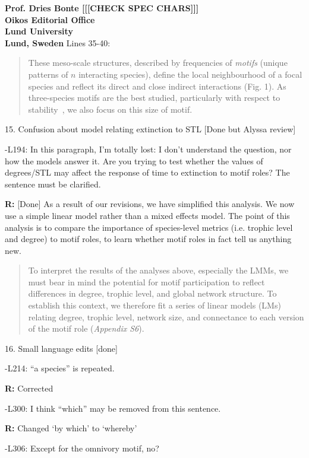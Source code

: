 \documentclass[12pt]{letter}
\begin{document}
\begin{letter}{\bf Prof. Dries Bonte [[[CHECK SPEC CHARS]]]\\
Oikos Editorial Office \\
Lund University \\
Lund, Sweden}
        Lines 35-40:
        
        \begin{quotation}
    	These meso-scale structures, described by frequencies of \emph{motifs} (unique patterns of $n$ interacting species), define the local neighbourhood of a focal species and reflect its direct and close indirect interactions (Fig. 1).
        As three-species motifs are the best studied, particularly with respect to stability~\citep{Stouffer2007,Borrelli2015,Borrelli2015a,Gilling2019}, we also focus on this size of motif.
        \end{quotation}



    15. Confusion about model relating extinction to STL [Done but Alyssa review]

      -L194: In this paragraph, I’m totally lost: I don’t understand the question, nor how the models answer it. Are you trying to test whether the values of degrees/STL may affect the response of time to extinction to motif roles? The sentence must be clarified.

      \textbf{R:} [Done]
      As a result of our revisions, we have simplified this analysis. We now use a simple linear model rather than a mixed effects model. The point of this analysis is to compare the importance of species-level metrics (i.e. trophic level and degree) to motif roles, to learn whether motif roles in fact tell us anything new.
      
      \begin{quotation}
      To interpret the results of the analyses above, especially the LMMs, we must bear in mind the potential for motif participation to reflect differences in degree, trophic level, and global network structure. 
      To establish this context, we therefore fit a series of linear models (LMs) relating degree, trophic level, network size, and connectance to each version of the motif role (\emph{Appendix S6}). 
      \end{quotation}
      


    16. Small language edits [done]

      -L214: ``a species'' is repeated.

        \textbf{R:} Corrected

      -L300: I think ``which'' may be removed from this sentence.

        \textbf{R:} Changed `by which' to `whereby'

      -L306: Except for the omnivory motif, no?


\end{letter}
\end{document}
